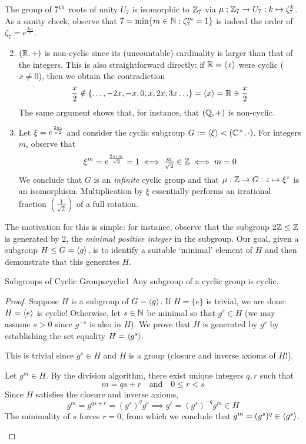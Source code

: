 \begin{examples}{}{}
	\exstart The group of $7\textsuperscript{th}$ roots of unity $U_7$ is isomorphic to $\mathbb{Z}_7$ via $\mu:\mathbb{Z}_7\to U_7:k\mapsto \zeta_7^k$. As a sanity check, observe that $7=\min\{m\in\mathbb{N}:\zeta_7^m=1\}$ is indeed the order of $\zeta_7 =e^{\frac{2\pi i}7}$.
	\begin{enumerate}\setcounter{enumi}{1}
		\item $(\mathbb{R},+)$ is non-cyclic since its (uncountable) cardinality is larger than that of the integers. This is also straightforward directly: if $\mathbb{R}=\left\langle x\right\rangle$ were cyclic ($x\neq 0$), then we obtain the contradiction
		\[
			\frac x2\notin\{\ldots,-2x,-x,0,x,2x,3x\ldots\}=\left\langle x\right\rangle=\mathbb{R}\ni\frac x2
		\]
		The same argument shows that, for instance, that $(\mathbb{Q},+)$ is non-cyclic.
		
		\item Let $\xi=\smash[t]{e^{\frac{2\pi i}{\sqrt 2}}}$ and consider the cyclic subgroup $G:=\left\langle \xi\right\rangle<(\mathbb{C}^\times,\cdot)$. For integers $m$, observe that
		\[
			\xi^m=e^{\frac{2\pi im}{\sqrt 2}}=1\iff \tfrac m{\sqrt 2}\in\mathbb{Z}\iff m=0
		\]
		We conclude that $G$ is an \emph{infinite} cyclic group and that $\mu:\mathbb{Z}\to G:z\mapsto\xi^z$ is an isomorphism. Multiplication by $\xi$ essentially performs an irrational fraction $(\frac 1{\sqrt 2})$ of a full rotation.
	\end{enumerate}
\end{examples}



The motivation for this is simple: for instance, observe that the subgroup $2\mathbb{Z}\le\mathbb{Z}$ is generated by 2, the \emph{minimal positive integer} in the subgroup. Our goal, given a subgroup $H\le G=\left\langle g\right\rangle$, is to identify a suitable `minimal' element of $H$ and then demonstrate that this generates $H$.

\begin{thm}{Subgroups of Cyclic Groups}{cyclic1}
	Any subgroup of a cyclic group is cyclic.
\end{thm}

\begin{proof}
	Suppose $H$ is a subgroup of $G=\left\langle g\right\rangle$. If $H=\{e\}$ is trivial, we are done: $H=\left\langle e\right\rangle$ is cyclic!\smallbreak
	Otherwise, let $s\in\mathbb{N}$ be minimal so that $g^s\in H$ (we may assume $s>0$ since $g^{-s}$ is also in $H$). We prove that $H$ is generated by $g^s$ by establishing the set equality $H=\left\langle g^s\right\rangle$.
	\begin{description}\itemsep0pt
		\item[$(\supseteq)$] This is trivial since $g^s\in H$ and $H$ is a group (closure and inverse axioms of $H$!).
		\item[$(\subseteq)$] Let $g^m\in H$. By the division algorithm, there exist unique integers $q,r$ such that
		\[
			m=qs+r\quad\text{and}\quad 0\le r<s
		\]
		Since $H$ satisfies the closure and inverse axioms,
		\[
			g^m=g^{qs+r}=(g^s)^qg^r\implies g^r=(g^s)^{-q}g^m\in H \tag{$\ast$}
		\]
		The minimality of $s$ forces $r=0$, from which we conclude that $g^m=(g^s)^q\in\left\langle g^s\right\rangle$.\qedhere 
	\end{description}
\end{proof}

